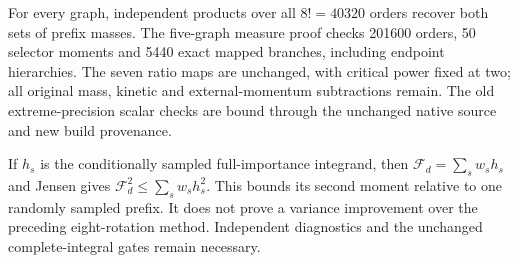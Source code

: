 \documentclass[11pt]{article}
\begin{document}
For every graph, independent products over all $8!=40320$ orders recover
both sets of prefix masses. The five-graph measure proof checks 201600
orders, 50 selector moments and 5440 exact mapped branches, including
endpoint hierarchies. The seven ratio maps are unchanged, with critical
power fixed at two; all original mass, kinetic and external-momentum
subtractions remain. The old extreme-precision scalar checks are bound
through the unchanged native source and new build provenance.

If $h_s$ is the conditionally sampled full-importance integrand, then
$\mathcal F_d=\sum_s w_s h_s$ and Jensen gives
$\mathcal F_d^2\leq\sum_s w_s h_s^2$. This bounds its second moment
relative to one randomly sampled prefix. It does not prove a variance
improvement over the preceding eight-rotation method. Independent
diagnostics and the unchanged complete-integral gates remain necessary.
\end{document}
